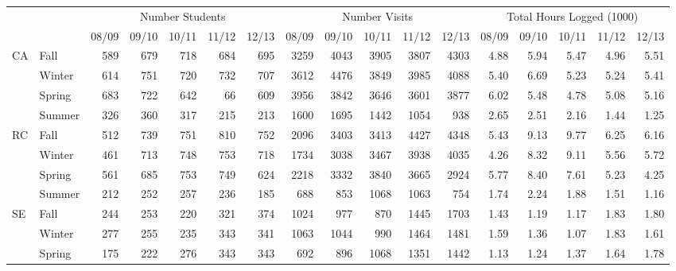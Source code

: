 

\fancyheadoffset[LE,LO]{0cm}

\begin{sidewaystable}[!h]
\centering
\begin{tabular}{llrrrrr|rrrrr|rrrrr}
\toprule
&&\multicolumn{5}{c|}{Number Students}&\multicolumn{5}{c|}{Number Visits}&\multicolumn{5}{c}{Total Hours Logged (1000)}\\
&& 08/09 & 09/10 & 10/11 & 11/12 & 12/13 & 08/09 & 09/10 & 10/11 & 11/12 & 12/13 & 08/09 & 09/10 & 10/11 & 11/12 & 12/13\\
\midrule
\multirow{4}{*}{CA}		&Fall&		589	&679	&718	&684	&695&	3259&4043&3905&3807&	4303&	4.88&5.94&5.47&4.96&5.51\\
					&Winter&		614	&751	&720	&732	&707&	3612&4476&3849&3985&	4088&	5.40&6.69&5.23&5.24&5.41\\
					&Spring&		683	&722&642&66&609&	3956&3842&3646&3601&	3877&	6.02&5.48&4.78&5.08&5.16\\
					&Summer&	326	&360&317&215&213&	1600&1695&1442&1054&	938&		2.65&2.51&2.16&1.44&1.25\\
\midrule
\multirow{4}{*}{RC}		&Fall&		512&	739&	751&	810&	752&		2096&3403&3413&4427&	4348&	5.43&9.13&9.77&6.25&6.16\\
					&Winter&		461&	713&	748&	753&	718&		1734&3038&3467&3938&	4035&	4.26&8.32&9.11&5.56&5.72\\
					&Spring&		561&	685&	753&	749&	624&		2218&3332&3840&3665&	2924&	5.77&8.40&7.61&5.23&4.25\\
					&Summer&	212&	252&	257&	236&	185&		688&	853&	1068&1063&	754&		1.74&2.24&1.88&1.51&1.16\\
\midrule
\multirow{4}{*}{SE}		&Fall	&		244&	253&	220&	321&	374&		1024&977&870&1445&	1703&	1.43&1.19&1.17&1.83&1.80\\
					&Winter&		277&	255&	235&	343&	341&		1063&1044&990&1464&	1481&	1.59&1.36&1.07&1.83&1.61\\
					&Spring&		175&	222&	276&	343&	343&		692&	896&	1068&1351&	1442&	1.13&1.24&1.37&1.64&1.78\\

\end{tabular}
\end{sidewaystable}
